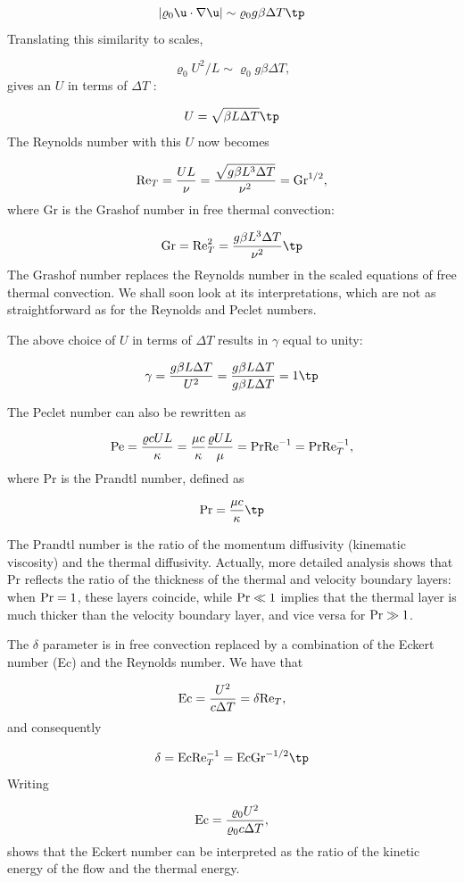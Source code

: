 \documentclass[graybox,envcountchap,sectrefs,final]{svmonodo}
\begin{document}
\[ |\varrho_0 \u\cdot\nabla\u| \sim \varrho_0 g \beta\Delta T\tp\]
Translating this similarity to scales,

\[ \varrho_0 U^2/L \sim \varrho_0 g \beta\Delta T,\]
gives an $U$ in terms of $\Delta T$ :

\[ U = \sqrt{\beta L \Delta T}\tp\]
The Reynolds number with this $U$ now becomes

\[ \hbox{Re}_T = \frac{UL}{\nu} = \frac{\sqrt{g\beta L^3 \Delta T}}{\nu^2}
= \hbox{Gr}^{1/2},\]
where Gr is the Grashof number in free thermal convection:

\[ \hbox{Gr} = \hbox{Re}_T^2 =  \frac{g\beta L^3 \Delta T}{\nu^2}\tp\]
The Grashof number replaces the Reynolds number in the scaled equations
of free thermal convection. We shall soon look at its interpretations,
which are not as straightforward as for the Reynolds and Peclet numbers.

The above
choice of $U$ in terms of $\Delta T$ results in $\gamma$ equal to unity:

\[ \gamma = \frac{g\beta L\Delta T }{U^2} =
\frac{g\beta L\Delta T }{g\beta L \Delta T} = 1\tp\]


The Peclet number can also be rewritten as

\[ \hbox{Pe}= \frac{\varrho c UL}{\kappa } = \frac{\mu c}{\kappa}
\frac{\varrho UL}{\mu}
= \hbox{Pr}\hbox{Re}^{-1} = \hbox{Pr}\hbox{Re}_T^{-1},\]
where Pr is the Prandtl number, defined as

\[ \hbox{Pr} = \frac{\mu c}{\kappa}\tp\]

The Prandtl number is the ratio of the momentum diffusivity (kinematic
viscosity) and the thermal diffusivity. Actually, more detailed
analysis shows that Pr reflects the ratio of the thickness of the
thermal and velocity boundary layers: when $\hbox{Pr}=1$, these layers
coincide, while $\hbox{Pr}\ll 1$ implies that the thermal layer is
much thicker than the velocity boundary layer, and vice versa for
$\hbox{Pr}\gg 1$.


The $\delta$ parameter is in free convection replaced by a combination
of the Eckert number (Ec) and the Reynolds number. We have that

\[ \hbox{Ec} = \frac{U^2}{c\Delta T} = \delta\hbox{Re}_T,\]
and consequently

\[ \delta = \hbox{Ec}\hbox{Re}_T^{-1} = \hbox{Ec}\hbox{Gr}^{-1/2}\tp\]
Writing

\[ \hbox{Ec} = \frac{\varrho_0U^2}{\varrho_0c\Delta T},\]
shows that the Eckert number can be interpreted as the ratio of
the kinetic energy of the flow and the thermal energy.
\end{document}
